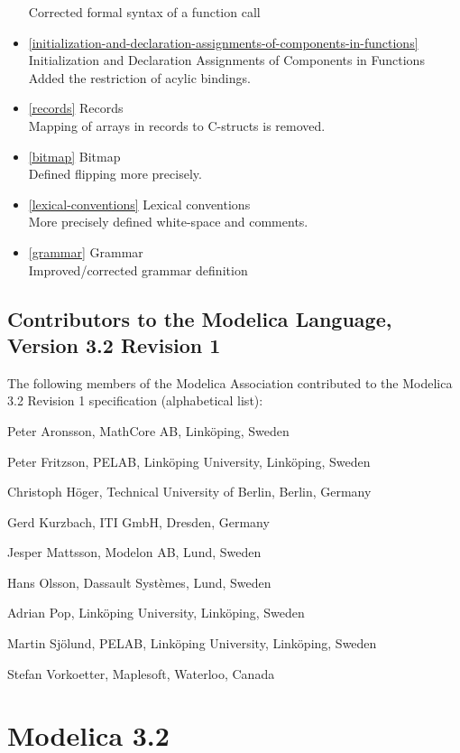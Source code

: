 \begin{itemize}
  Corrected formal syntax of a function call
\item
  \cref{initialization-and-declaration-assignments-of-components-in-functions} Initialization and Declaration Assignments of
  Components in Functions\\
  Added the restriction of acylic bindings.
\item
  \cref{records} Records\\
  Mapping of arrays in records to C-structs is removed.
\item
  \cref{bitmap} Bitmap\\
  Defined flipping more precisely.
\item
  \cref{lexical-conventions} Lexical conventions\\
  More precisely defined white-space and comments.
\item
  \cref{grammar} Grammar\\
  Improved/corrected grammar definition
\end{itemize}

\subsection{Contributors to the Modelica Language, Version 3.2 Revision 1}\label{contributors-to-the-modelica-language-version-3-2-revision-1}

The following members of the Modelica Association contributed to the
Modelica 3.2 Revision 1 specification (alphabetical list):

Peter Aronsson, MathCore AB, Linköping, Sweden

Peter Fritzson, PELAB, Linköping University, Linköping, Sweden

Christoph Höger, Technical University of Berlin, Berlin, Germany

Gerd Kurzbach, ITI GmbH, Dresden, Germany

Jesper Mattsson, Modelon AB, Lund, Sweden

Hans Olsson, Dassault Systèmes, Lund, Sweden

Adrian Pop, Linköping University, Linköping, Sweden

Martin Sjölund, PELAB, Linköping University, Linköping, Sweden

Stefan Vorkoetter, Maplesoft, Waterloo, Canada

\section{Modelica 3.2}\label{modelica-3-2}

